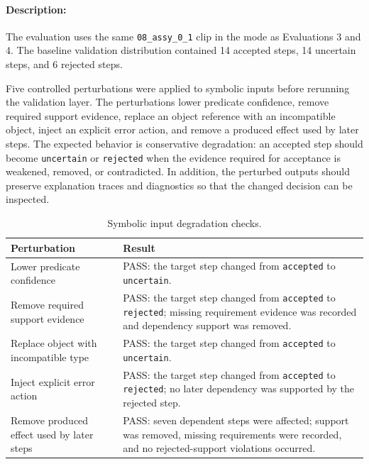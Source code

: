 \paragraph{Description:}
The evaluation uses the same \texttt{08\_assy\_0\_1} clip in the
 mode as Evaluations 3 and 4. The baseline validation distribution contained 14 accepted steps, 14 uncertain steps, and 6 rejected steps.

Five controlled perturbations were applied to symbolic inputs before rerunning
the validation layer. The perturbations lower predicate confidence, remove
required support evidence, replace an object reference with an incompatible
object, inject an explicit error action, and remove a produced effect used by
later steps. The expected behavior is conservative degradation: an accepted step
should become \texttt{uncertain} or \texttt{rejected} when the evidence required
for acceptance is weakened, removed, or contradicted. In addition, the perturbed
outputs should preserve explanation traces and diagnostics so that the changed
decision can be inspected.

\begin{table}[htbp]
\centering
\caption{Symbolic input degradation checks.}
\label{tab:evaluation-symbolic-degradation}
\small
\begin{tabular}{p{} p{}}
\toprule
Perturbation & Result \\
\midrule
Lower predicate confidence &
PASS: the target step changed from \texttt{accepted} to \texttt{uncertain}. \\

Remove required support evidence &
PASS: the target step changed from \texttt{accepted} to \texttt{rejected}; missing requirement evidence was recorded and dependency support was removed. \\

Replace object with incompatible type &
PASS: the target step changed from \texttt{accepted} to \texttt{uncertain}. \\

Inject explicit error action &
PASS: the target step changed from \texttt{accepted} to \texttt{rejected}; no later dependency was supported by the rejected step. \\

Remove produced effect used by later steps &
PASS: seven dependent steps were affected; support was removed, missing requirements were recorded, and no rejected-support violations occurred. \\
\bottomrule
\end{tabular}
\end{table}



